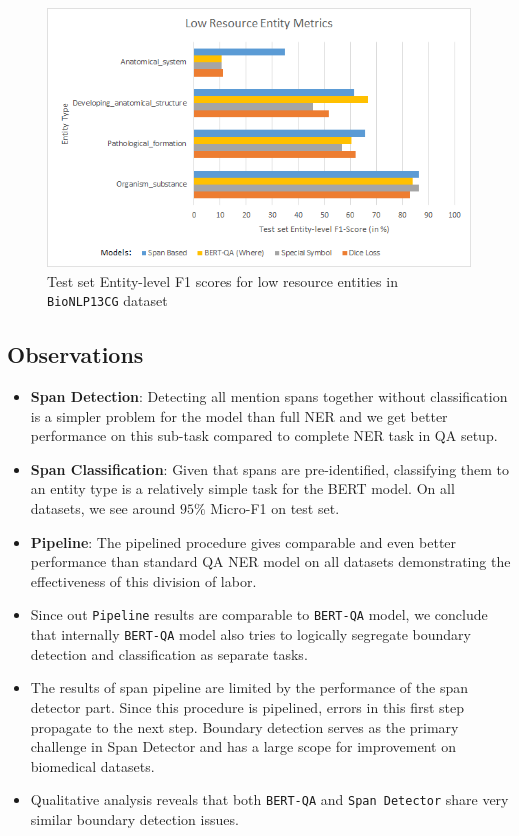 \begin{figure}
    \centering
    \includegraphics[scale=0.5]{../thesis/low_resource_entity_metrics}
    \caption{Test set Entity-level F1 scores for low resource entities in \texttt{BioNLP13CG} dataset}
    \label{fig:low_resource_entity_metrics}
\end{figure}

\fi

\subsection{Observations}
\begin{itemize}
    \item \textbf{Span Detection}: Detecting all mention spans together without classification is a simpler problem for the model than full NER and we get better performance on this sub-task compared to complete NER task in QA setup.
    
    \item \textbf{Span Classification}: Given that spans are pre-identified, classifying them to an entity type is a relatively simple task for the BERT model. On all datasets, we see around $95\%$ Micro-F1 on test set.
    
    \item \textbf{Pipeline}: The pipelined procedure gives comparable and even better performance than standard QA NER model on all datasets demonstrating the effectiveness of this division of labor. 
    
    \item Since out \texttt{Pipeline} results are comparable to \texttt{BERT-QA} model, we conclude that internally \texttt{BERT-QA} model also tries to logically segregate boundary detection and classification as separate tasks.
    
    \item The results of span pipeline are limited by the performance of the span detector part. Since this procedure is pipelined, errors in this first step propagate to the next step. Boundary detection serves as the primary challenge in Span Detector and has a large scope for improvement on biomedical datasets.
    
    \item Qualitative analysis reveals that both \texttt{BERT-QA} and \texttt{Span Detector} share very similar boundary detection issues.
\end{itemize}

